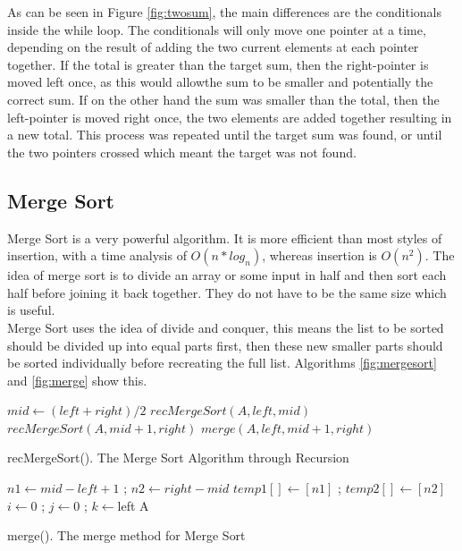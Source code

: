 \documentclass[10pt,twocolumn,hidelinks]{IEEEtran}
\begin{document}
As can be seen in Figure \ref{fig:twosum}, the main differences are the conditionals inside the while loop. The conditionals will only move one pointer at a time, depending on the result of adding the two current elements at each pointer together. If the total is greater than the target sum, then the right-pointer is moved left once, as this would allowthe sum to be smaller and potentially the correct sum. If on the other hand the sum was smaller than the total, then the left-pointer is moved right once, the two elements are added together resulting in a new total. This process was repeated until the target sum was found, or until the two pointers crossed which meant the target was not found.

\subsection{Merge Sort}
Merge Sort is a very powerful algorithm. It is more efficient than most styles of insertion, with a time analysis of $O(n * log_{n})$, whereas insertion is $O(n^2)$. The idea of merge sort is to divide an array or some input in half and then sort each half before joining it back together. They do not have to be the same size which is useful.  \\
Merge Sort uses the idea of divide and conquer, this means the list to be sorted should be divided up into equal parts first, then these new smaller parts should be sorted individually before recreating the full list. Algorithms \ref{fig:mergesort} and \ref{fig:merge} show this.
\IncMargin{1em}
\begin{algorithm}
	\LinesNumbered
  	{$mid \longleftarrow (left+right)/2$\;
  	$recMergeSort(A,left,mid)$\;
  	$recMergeSort(A,mid+1,right)$\;
  	$merge(A,left,mid+1,right)$
  	}
\caption{recMergeSort(). The Merge Sort Algorithm through Recursion}
\label{fig:mergesort}
\end{algorithm}\DecMargin{1em}

\IncMargin{1em}
\begin{algorithm}
	\LinesNumbered
 	$n1 \longleftarrow mid - left + 1$ ; $n2 \longleftarrow right - mid$\;
 	$temp1[] \longleftarrow [n1]$  ; $temp2[]\longleftarrow [n2]$\;
	$i \longleftarrow $0 ; $j \longleftarrow $0 ; $k \longleftarrow $left
	\Return A
\caption{merge(). The merge method for Merge Sort}
\label{fig:merge}
\end{algorithm}\DecMargin{1em}
\end{document}
